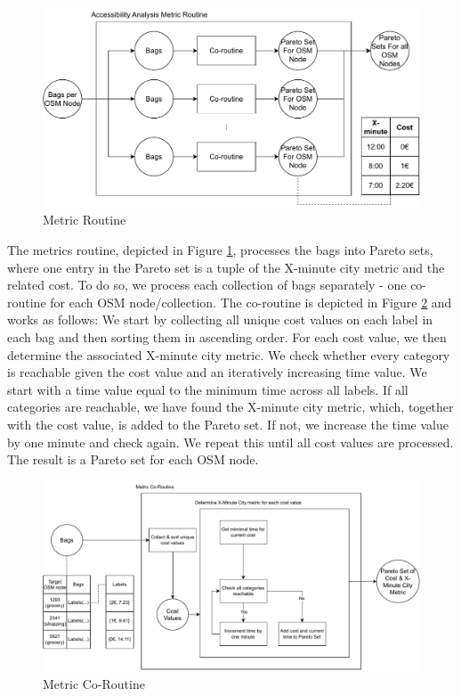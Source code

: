 \begin{figure}
    \centering
    \includegraphics[scale=0.50]{Figures/method/metric_routine}
    \caption{Metric Routine}
    \label{fig:metric_routine}
\end{figure}
The metrics routine, depicted in Figure \ref{fig:metric_routine}, processes the bags into Pareto sets, where one entry in the Pareto set is a tuple of the X-minute city metric and the related cost.
To do so, we process each collection of bags separately - one co-routine for each OSM node/collection.
The co-routine is depicted in Figure \ref{fig:metric_co_routine} and works as follows:
We start by collecting all unique cost values on each label in each bag and then sorting them in ascending order.
For each cost value, we then determine the associated X-minute city metric.
We check whether every category is reachable given the cost value and an iteratively increasing time value.
We start with a time value equal to the minimum time across all labels.
If all categories are reachable, we have found the X-minute city metric, which, together with the cost value, is added to the Pareto set.
If not, we increase the time value by one minute and check again.
We repeat this until all cost values are processed.
The result is a Pareto set for each OSM node.

\begin{figure}
    \centering
    \includegraphics[scale=0.60]{Figures/method/metric_coroutine}
    \caption{Metric Co-Routine}
    \label{fig:metric_co_routine}
\end{figure}
